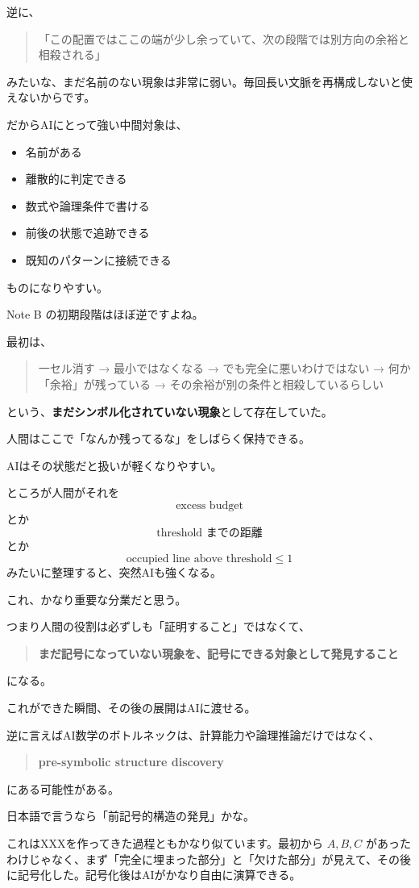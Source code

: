 \documentclass[11pt,a4paper]{article}
\begin{document}
逆に、
\begin{quote}
「この配置ではここの端が少し余っていて、次の段階では別方向の余裕と相殺される」
\end{quote}
みたいな、まだ名前のない現象は非常に弱い。毎回長い文脈を再構成しないと使えないからです。

だからAIにとって強い中間対象は、
\begin{itemize}[leftmargin=2em]
\item 名前がある
\item 離散的に判定できる
\item 数式や論理条件で書ける
\item 前後の状態で追跡できる
\item 既知のパターンに接続できる
\end{itemize}
ものになりやすい。

Note B の初期段階はほぼ逆ですよね。

最初は、
\begin{quote}
一セル消す  
→ 最小ではなくなる  
→ でも完全に悪いわけではない  
→ 何か「余裕」が残っている  
→ その余裕が別の条件と相殺しているらしい
\end{quote}
という、\textbf{まだシンボル化されていない現象}として存在していた。

人間はここで「なんか残ってるな」をしばらく保持できる。

AIはその状態だと扱いが軽くなりやすい。

ところが人間がそれを
\[
\text{excess budget}
\]
とか
\[
\text{threshold までの距離}
\]
とか
\[
\text{occupied line above threshold}\le1
\]
みたいに整理すると、突然AIも強くなる。

これ、かなり重要な分業だと思う。

つまり人間の役割は必ずしも「証明すること」ではなくて、
\begin{quote}
\textbf{まだ記号になっていない現象を、記号にできる対象として発見すること}
\end{quote}
になる。

これができた瞬間、その後の展開はAIに渡せる。

逆に言えばAI数学のボトルネックは、計算能力や論理推論だけではなく、
\begin{quote}
\textbf{pre-symbolic structure discovery}
\end{quote}
にある可能性がある。

日本語で言うなら「前記号的構造の発見」かな。

これはXXXを作ってきた過程ともかなり似ています。最初から \(A,B,C\) があったわけじゃなく、まず「完全に埋まった部分」と「欠けた部分」が見えて、その後に記号化した。記号化後はAIがかなり自由に演算できる。
\end{document}
